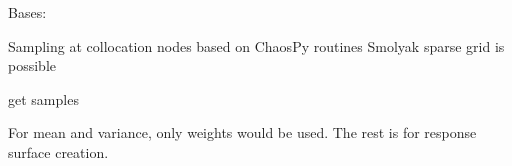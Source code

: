 \documentclass[letterpaper,10pt,english]{sphinxmanual}
\begin{document}
\begin{fulllineitems}
\label{\detokenize{sampling:sampling.sampling.Collocation}}
Bases: {\hyperref[\detokenize{sampling:sampling.sampling.Sampling}]{}}

Sampling at collocation nodes based on ChaosPy routines
Smolyak sparse grid is possible

\begin{fulllineitems}
\label{\detokenize{sampling:sampling.sampling.Collocation.defaults_}}
\end{fulllineitems}


\begin{fulllineitems}
\label{\detokenize{sampling:sampling.sampling.Collocation.get}}
get samples

\end{fulllineitems}


\begin{fulllineitems}
\label{\detokenize{sampling:sampling.sampling.Collocation.sampling_prms}}
For mean and variance, only weights would be used. 
The rest is for response surface creation.

\end{fulllineitems}


\end{fulllineitems}

\end{document}
